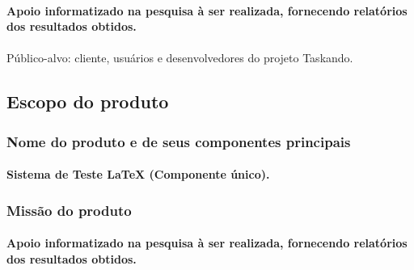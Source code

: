 \documentclass{article}
\begin{document}
			\paragraph{Apoio informatizado na pesquisa à ser realizada, fornecendo relatórios dos resultados obtidos.}
			
			\paragraph{}Público-alvo: cliente, usuários e desenvolvedores do projeto Taskando.
	\subsection{Escopo do produto}
		\subsubsection{Nome do produto e de seus componentes principais}
			\paragraph{Sistema de Teste LaTeX (Componente único). }
		\subsubsection{Missão do produto}
			\paragraph{Apoio informatizado na pesquisa à ser realizada, fornecendo relatórios dos resultados obtidos.}
			
\end{document}

